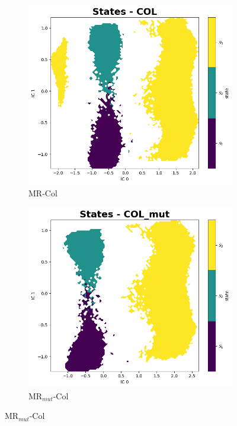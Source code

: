 \documentclass[
  journal=usp, %
  manuscript=final-report,
  year=2023,
  volume=1,
]{cup-journal}
\begin{document}
{\begin{figure}[hbt!]
\medskip %
\begin{subfigure}{.45\linewidth}
  \includegraphics[width=\linewidth]{Images/States_COL_7000K.png}
  \caption{MR-Col}
  \label{MC_states_MR-col}
\end{subfigure}\hfill %
\begin{subfigure}{.45\linewidth}
  \includegraphics[width=\linewidth]{Images/States_COL_mut_7000K.png}
  \caption{MR$_{mut}$-Col}
  \label{MC_states_MR-col_mut}
\end{subfigure}


\end{figure}}
\end{document}
